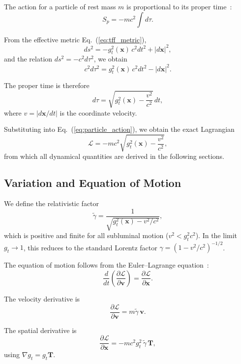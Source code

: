 \documentclass[12pt]{article}
\begin{document}
The action for a particle of rest mass $m$ is proportional to its proper time~\cite{Goldstein2002}:
\begin{equation}
S_p = -mc^2 \int d\tau .
\label{eq:particle_action}
\end{equation}

From the effective metric Eq.~(\ref{eq:tff_metric}),
$$
ds^2 = -g_t^2(\mathbf{x})\, c^2 dt^2 + |d\mathbf{x}|^2 ,
$$
and the relation $ds^2 = -c^2 d\tau^2$, we obtain
$$
c^2 d\tau^2 = g_t^2(\mathbf{x})\, c^2 dt^2 - |d\mathbf{x}|^2 .
$$

The proper time is therefore
\begin{equation}
d\tau = \sqrt{g_t^2(\mathbf{x}) - \frac{v^2}{c^2}}\, dt ,
\label{eq:proper_time_full}
\end{equation}
where $v = |d\mathbf{x}/dt|$ is the coordinate velocity.

Substituting into Eq.~(\ref{eq:particle_action}), we obtain the exact Lagrangian
\begin{equation}
\mathcal{L} = -mc^2 \sqrt{g_t^2(\mathbf{x}) - \frac{v^2}{c^2}} ,
\label{eq:lagrangian_exact}
\end{equation}
from which all dynamical quantities are derived in the following sections.

\subsection{Variation and Equation of Motion}
\label{sec:eom_variation}

We define the relativistic factor
\begin{equation}
\tilde{\gamma} = \frac{1}{\sqrt{g_t^2(\mathbf{x}) - v^2/c^2}} ,
\end{equation}
which is positive and finite for all subluminal motion ($v^2 < g_t^2 c^2$). In the limit $g_t \to 1$, this reduces to the standard Lorentz factor
$\gamma = (1 - v^2/c^2)^{-1/2}$.

The equation of motion follows from the Euler--Lagrange equation~\cite{Goldstein2002}:
$$
\frac{d}{dt}\left(\frac{\partial \mathcal{L}}{\partial \mathbf{v}}\right)
= \frac{\partial \mathcal{L}}{\partial \mathbf{x}} .
$$

The velocity derivative is
$$
\frac{\partial \mathcal{L}}{\partial \mathbf{v}}
= m \tilde{\gamma}\, \mathbf{v} .
$$

The spatial derivative is
$$
\frac{\partial \mathcal{L}}{\partial \mathbf{x}}
= -mc^2 g_t^2\, \tilde{\gamma}\, \mathbf{T} ,
$$
using $\nabla g_t = g_t \mathbf{T}$.
\end{document}
